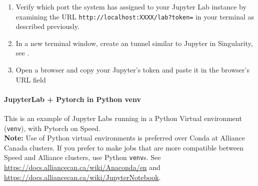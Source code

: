 \begin{itemize}
\begin{enumerate}
		\item
		Verify which port the system has assigned to your Jupyter Lab instance by examining the URL
		\texttt{http://localhost:XXXX/lab?token=} in your terminal as described
		previously.

		\item
		In a new terminal window, create an  tunnel similar to Jupyter 
    in Singularity, see .

		\item
		Open a browser and copy your Jupyter's token and paste it in the browser's URL field
	\end{enumerate}
\end{itemize}

\paragraph{JupyterLab + Pytorch in Python venv}
\label{sect:jupyterlabs-venv}

This is an example of Jupyter Labs running in a Python Virtual environment (\texttt{venv}), with Pytorch on Speed.\\

\noindent
\textbf{Note:} Use of Python virtual environments is preferred over Conda at Alliance Canada clusters.
If you prefer to make jobs that are more compatible between Speed and Alliance clusters, use Python
\texttt{venv}s. See \url{https://docs.alliancecan.ca/wiki/Anaconda/en}
and \url{https://docs.alliancecan.ca/wiki/JupyterNotebook}.

